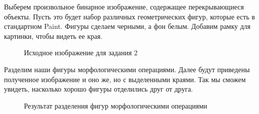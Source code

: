 \documentclass[a4paper, 12pt]{article}
\begin{document}
    Выберем произвольное бинарное изображение, содержащее перекрывающиеся объекты. Пусть это будет набор
    различных геометрических фигур, которые есть в стандартном Paint. Фигуры сделаем черными, а фон белым.
    Добавим рамку для картинки, чтобы видеть ее края.
    \begin{figure}[H]
        \centering
        \captionsetup{skip=0pt}
        \caption{Исходное изображение для задания 2}
        \label{fig:bin}
    \end{figure}
    Разделим наши фигуры морфологическими операциями. Далее будут приведены полученное изображение и оно же, но
    с выделенными краями. Так мы сможем увидеть, насколько хорошо фигуры отделились друг от друга.
    \begin{figure}[H]
        \centering
        \captionsetup{skip=0pt}
        \caption{Результат разделения фигур морфологическими операциями}
        \label{fig:binn}
    \end{figure}
\end{document}
